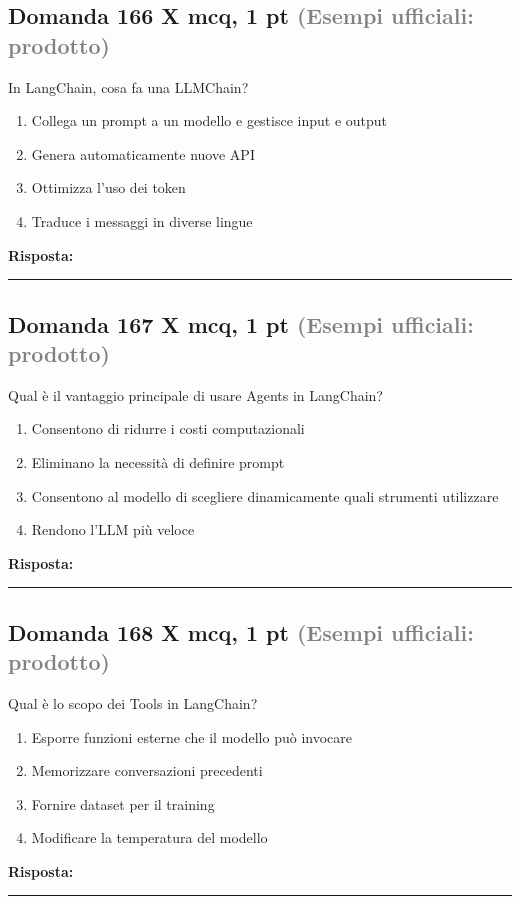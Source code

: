 \documentclass[a4paper,11pt]{article}
\begin{document}
\subsection*{Domanda 166 X \hfill {\small mcq, 1 pt \textcolor{gray}{(Esempi ufficiali: prodotto)}}}
In LangChain, cosa fa una LLMChain?

\begin{enumerate}[label=\alph*)]
\item Collega un prompt a un modello e gestisce input e output
\item Genera automaticamente nuove API
\item Ottimizza l'uso dei token
\item Traduce i messaggi in diverse lingue
\end{enumerate}
\vspace{0.2cm}
\noindent\textbf{Risposta:}\par
\vspace{1.5cm}\hrule


\subsection*{Domanda 167 X \hfill {\small mcq, 1 pt \textcolor{gray}{(Esempi ufficiali: prodotto)}}}
Qual è il vantaggio principale di usare Agents in LangChain?

\begin{enumerate}[label=\alph*)]
\item Consentono di ridurre i costi computazionali
\item Eliminano la necessità di definire prompt
\item Consentono al modello di scegliere dinamicamente quali strumenti utilizzare
\item Rendono l'LLM più veloce
\end{enumerate}
\vspace{0.2cm}
\noindent\textbf{Risposta:}\par
\vspace{1.5cm}\hrule


\subsection*{Domanda 168 X \hfill {\small mcq, 1 pt \textcolor{gray}{(Esempi ufficiali: prodotto)}}}
Qual è lo scopo dei Tools in LangChain?

\begin{enumerate}[label=\alph*)]
\item Esporre funzioni esterne che il modello può invocare
\item Memorizzare conversazioni precedenti
\item Fornire dataset per il training
\item Modificare la temperatura del modello
\end{enumerate}
\vspace{0.2cm}
\noindent\textbf{Risposta:}\par
\vspace{1.5cm}\hrule
\end{document}
